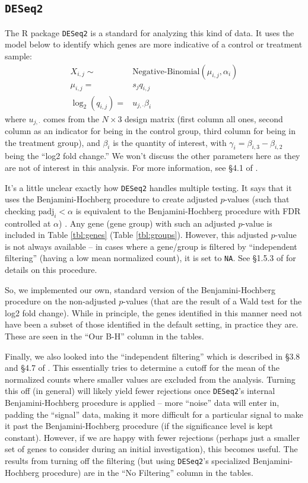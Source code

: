 \documentclass{article}
\begin{document}
\subsection{\texttt{DESeq2}}
The R package \texttt{DESeq2} is a standard for analyzing this kind of data. It uses the model below to identify
which genes are more indicative of a control or treatment sample:
\begin{align*}
X_{i,j}\sim& \textrm{Negative-Binomial}(\mu_{i,j}, \alpha_i)\\
\mu_{i,j}=&s_jq_{i,j}\\
\log_2(q_{i,j})=&u_{j,\cdot} \beta_i
\end{align*}
where $u_{j,\cdot}$ comes from the $N\times 3$ design matrix (first column all ones, second column as an indicator
for being in the control group, third column for being in the treatment group), and $\beta_i$ is the quantity of interest,
with $\gamma_i=\beta_{i, 3}-\beta_{i,2}$ being the ``log2 fold change.'' We won't discuss the other parameters
here as they are not of interest in this analysis. For more information, see \S4.1 of \citep{deseq2}.

It's a little unclear exactly how \texttt{DESeq2} handles multiple testing. It says that it uses the Benjamini-Hochberg
procedure to create adjusted $p$-values (such that checking $\textrm{padj}_i<\alpha$ is equivalent to the
Benjamini-Hochberg procedure with FDR controlled at $\alpha$) \citep{benjamini1995controlling}. 
Any gene (gene group) with such an adjusted $p$-value is included in Table \ref{tbl:genes} (Table \ref{tbl:groups}).
However, this 
adjusted $p$-value is not always available -- in cases where a gene/group is filtered by ``independent filtering'' (having a low
mean normalized count),
it is set to \texttt{NA}. See \S1.5.3 of \citep{deseq2} for details on this procedure.

So, we implemented our own, standard version of the Benjamini-Hochberg procedure
on the non-adjusted $p$-values (that are the result of a Wald test for the log2 fold change). While in principle,
the genes identified in this manner need not have been a subset of those identified in the default setting,
in practice they are. These are seen in the ``Our B-H'' column in the tables.

Finally, we also looked into the ``independent filtering'' which is described in \S3.8 and \S4.7 of \citep{deseq2}.
This essentially tries to determine a cutoff for the mean of the normalized counts where smaller values are
excluded from the analysis. Turning this off (in general) will likely yield fewer rejections once \texttt{DESeq2}'s 
internal Benjamini-Hochberg procedure is applied -- more ``noise'' data will enter in, padding the ``signal'' data,
making it more difficult for a particular signal to make it past the Benjamini-Hochberg procedure (if the significance
level is kept constant). However, if we are happy with fewer rejections (perhaps just a smaller set of genes
to consider during an initial investigation), this becomes useful. The results from turning off the filtering (but using
\texttt{DESeq2}'s specialized Benjamini-Hochberg procedure) are in the ``No Filtering'' column in the tables.
\end{document}
